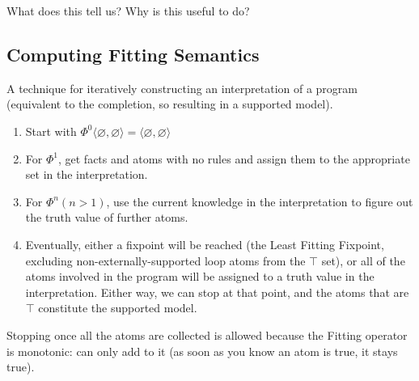 \documentclass[9pt,a4paper,landscape]{article}
\begin{document}
{\begin{center}
\begin{tabular}{p{3cm}p{5cm}p{6cm}}
	\end{tabular}
\end{center}

What does this tell us? Why is this useful to do?

\pagebreak


\subsection{Computing Fitting Semantics}
\label{subsec:fitting-sem}

A technique for iteratively constructing an interpretation of a program (equivalent to the completion, so resulting in a supported model).

\begin{enumerate}[noitemsep]
	\item Start with $\Phi^0 \langle \varnothing, \varnothing \rangle = \langle \varnothing, \varnothing \rangle$
	\item For $\Phi^1$, get facts and atoms with no rules and assign them to the appropriate set in the interpretation.
	\item For  $\Phi^n (n>1)$, use the current knowledge in the interpretation to figure out the truth value of further atoms.
	\item Eventually, either a fixpoint will be reached (the Least Fitting Fixpoint, excluding non-externally-supported loop atoms from the $\top$ set), or all of the atoms involved in the program will be assigned to a truth value in the interpretation. Either way, we can stop at that point, and the atoms that are $\top$ constitute the supported model.
\end{enumerate}

Stopping once all the atoms are collected is allowed because the Fitting operator is monotonic: can only add to it (as soon as you know an atom is true, it stays true).

}
\end{document}
